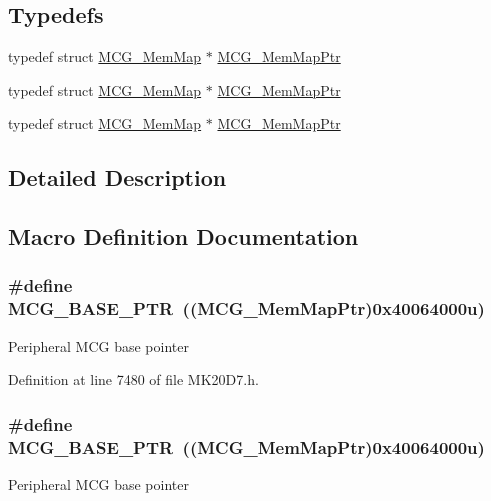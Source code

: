 \subsection*{Typedefs}
\begin{DoxyCompactItemize}
\item 
typedef struct \hyperlink{struct_m_c_g___mem_map}{M\+C\+G\+\_\+\+Mem\+Map} $\ast$ \hyperlink{group___m_c_g___peripheral_ga1cb93dd00863c129e7753ec45a7c3563}{M\+C\+G\+\_\+\+Mem\+Map\+Ptr}
\item 
typedef struct \hyperlink{struct_m_c_g___mem_map}{M\+C\+G\+\_\+\+Mem\+Map} $\ast$ \hyperlink{group___m_c_g___peripheral_ga1cb93dd00863c129e7753ec45a7c3563}{M\+C\+G\+\_\+\+Mem\+Map\+Ptr}
\item 
typedef struct \hyperlink{struct_m_c_g___mem_map}{M\+C\+G\+\_\+\+Mem\+Map} $\ast$ \hyperlink{group___m_c_g___peripheral_ga1cb93dd00863c129e7753ec45a7c3563}{M\+C\+G\+\_\+\+Mem\+Map\+Ptr}
\end{DoxyCompactItemize}


\subsection{Detailed Description}


\subsection{Macro Definition Documentation}
\subsubsection[{\texorpdfstring{M\+C\+G\+\_\+\+B\+A\+S\+E\+\_\+\+P\+TR}{MCG_BASE_PTR}}]{\setlength{\rightskip}{0pt plus 5cm}\#define M\+C\+G\+\_\+\+B\+A\+S\+E\+\_\+\+P\+TR~(({\bf M\+C\+G\+\_\+\+Mem\+Map\+Ptr})0x40064000u)}\hypertarget{group___m_c_g___peripheral_gaceefc72e93a47a35f59a31c57dddf41b}{}\label{group___m_c_g___peripheral_gaceefc72e93a47a35f59a31c57dddf41b}
Peripheral M\+CG base pointer 

Definition at line 7480 of file M\+K20\+D7.\+h.

\subsubsection[{\texorpdfstring{M\+C\+G\+\_\+\+B\+A\+S\+E\+\_\+\+P\+TR}{MCG_BASE_PTR}}]{\setlength{\rightskip}{0pt plus 5cm}\#define M\+C\+G\+\_\+\+B\+A\+S\+E\+\_\+\+P\+TR~(({\bf M\+C\+G\+\_\+\+Mem\+Map\+Ptr})0x40064000u)}\hypertarget{group___m_c_g___peripheral_gaceefc72e93a47a35f59a31c57dddf41b}{}\label{group___m_c_g___peripheral_gaceefc72e93a47a35f59a31c57dddf41b}
Peripheral M\+CG base pointer 

